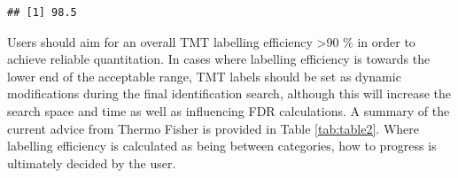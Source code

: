 \documentclass[9pt,a4paper,]{extarticle}
\newenvironment{Shaded}{\begin{snugshade}}{\end{snugshade}}
\newcommand{\AttributeTok}[1]{\textcolor[rgb]{0.77,0.63,0.00}{#1}}
\newcommand{\DecValTok}[1]{\textcolor[rgb]{0.00,0.00,0.81}{#1}}
\newcommand{\DocumentationTok}[1]{\textcolor[rgb]{0.56,0.35,0.01}{\textbf{\textit{#1}}}}
\newcommand{\FunctionTok}[1]{\textcolor[rgb]{0.00,0.00,0.00}{#1}}
\newcommand{\NormalTok}[1]{#1}
\newcommand{\OtherTok}[1]{\textcolor[rgb]{0.56,0.35,0.01}{#1}}
\newcommand{\SpecialCharTok}[1]{\textcolor[rgb]{0.00,0.00,0.00}{#1}}
\newcommand{\StringTok}[1]{\textcolor[rgb]{0.31,0.60,0.02}{#1}}
\begin{document}
\begin{Shaded}
\end{Shaded}

\begin{verbatim}
## [1] 98.5
\end{verbatim}

Users should aim for an overall TMT labelling efficiency \textgreater90 \% in order to
achieve reliable quantitation. In cases where labelling efficiency is towards
the lower end of the acceptable range, TMT labels should be set as dynamic
modifications during the final identification search, although this will
increase the search space and time as well as influencing FDR calculations. A
summary of the current advice from Thermo Fisher is provided in Table
\ref{tab:table2}. Where labelling efficiency is calculated as being between
categories, how to progress is ultimately decided by the user.
\end{document}

